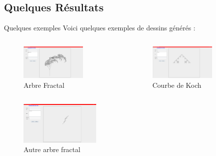 \documentclass{beamer}
\begin{document}
\subsection{Quelques Résultats}
\begin{frame}{Quelques exemples}
    Voici quelques exemples de dessins générés :
    \begin{columns}[T]
        \begin{column}{0.5\textwidth}
            \begin{figure}
                \centering
                \includegraphics[width=0.75\textwidth]{./images/ArbreFractal.png}
                \caption{Arbre Fractal}
            \end{figure}
        \end{column}
            
        \begin{column}{0.5\textwidth}
            \begin{figure}
                \centering
                \includegraphics[width=0.75\textwidth]{./images/CourbeKoch.png}
                \caption{Courbe de Koch}
            \end{figure}
        \end{column}
    \end{columns}
    \begin{figure}
        \centering
        \includegraphics[width=0.35\textwidth]{./images/AutreArbre.png}
        \caption{Autre arbre fractal}
    \end{figure}
\end{frame}
\end{document}
